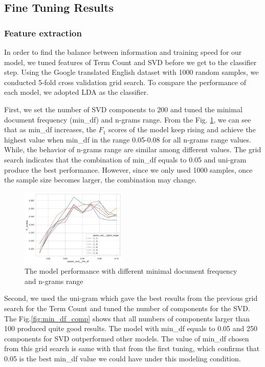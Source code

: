 \documentclass[compsoc]{IEEEtran}
\begin{document}
\subsection{Fine Tuning Results}
\subsubsection{Feature extraction}

In order to find the balance between information and training speed for our model, we tuned features of Term Count and SVD before we get to the classifier step. Using the Google translated English dataset with 1000 random samples, we conducted 5-fold cross validation grid search. To compare the performance of each model, we adopted LDA as the classifier. 

First, we set the number of SVD components to 200 and tuned the minimal document frequency (min\_df) and n-grams range. From the Fig. \ref{fig:min_df_ngram}, we can see that as min\_df increases, the $F_1$ scores of the model keep rising and achieve the highest value when min\_df in the range 0.05-0.08 for all n-grams range values. While, the behavior of n-grams range are similar among different values. The grid search indicates that the combination of min\_df equals to 0.05 and uni-gram produce the best performance. However, since we only used 1000 samples, once the sample size becomes larger, the combination may change.


\begin{figure}[htbp]
\centering
\includegraphics[width=0.45\textwidth]{min_df_ngram.png}
\caption{The model performance with different minimal document frequency and n-grams range}
\label{fig:min_df_ngram}
\end{figure}

Second, we used the uni-gram which gave the best results from the previous grid search for the Term Count and tuned the number of components for the SVD. The Fig.\ref{fig:min_df_comp} shows that all numbers of components larger than 100 produced quite good results. The model with min\_df equals to 0.05 and 250 components for SVD outperformed other models. The value of min\_df chosen from this grid search is same with that from the first tuning, which confirms that 0.05 is the best min\_df value we could have under this modeling condition.
\end{document}
